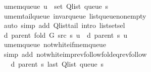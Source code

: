 \begin{isabellebody}
\ u{\isacharunderscore}{\kern0pt}mem{\isacharunderscore}{\kern0pt}queue{\isacharcolon}{\kern0pt}\ {\isachardoublequoteopen}u\ {\isasymin}\ set\ {\isacharparenleft}{\kern0pt}Q{\isacharunderscore}{\kern0pt}list\ {\isacharparenleft}{\kern0pt}queue\ s{\isacharparenright}{\kern0pt}{\isacharparenright}{\kern0pt}{\isachardoublequoteclose}\isanewline
\ \ \ \ \isamarkupfalse%
\ u{\isacharunderscore}{\kern0pt}mem{\isacharunderscore}{\kern0pt}tail{\isacharunderscore}{\kern0pt}queue\ invar{\isacharunderscore}{\kern0pt}queue\ list{\isacharunderscore}{\kern0pt}queue{\isacharunderscore}{\kern0pt}non{\isacharunderscore}{\kern0pt}empty\isanewline
\ \ \ \ \isamarkupfalse%
\ {\isacharparenleft}{\kern0pt}auto\ simp\ add{\isacharcolon}{\kern0pt}\ Q{\isachardot}{\kern0pt}list{\isacharunderscore}{\kern0pt}tail\ intro{\isacharcolon}{\kern0pt}\ list{\isachardot}{\kern0pt}set{\isacharunderscore}{\kern0pt}sel{\isacharparenleft}{\kern0pt}{}{\isacharparenright}{\kern0pt}{\isacharparenright}{\kern0pt}\isanewline
\ \ \isamarkupfalse%
\ {\isachardoublequoteopen}d\ {\isacharparenleft}{\kern0pt}parent\ {\isacharparenleft}{\kern0pt}fold\ G\ src\ s{\isacharparenright}{\kern0pt}{\isacharparenright}{\kern0pt}\ u\ {\isacharequal}{\kern0pt}\ d\ {\isacharparenleft}{\kern0pt}parent\ s{\isacharparenright}{\kern0pt}\ u{\isachardoublequoteclose}\isanewline
\ \ \ \ \isamarkupfalse%
\ u{\isacharunderscore}{\kern0pt}mem{\isacharunderscore}{\kern0pt}queue\ not{\isacharunderscore}{\kern0pt}white{\isacharunderscore}{\kern0pt}if{\isacharunderscore}{\kern0pt}mem{\isacharunderscore}{\kern0pt}queue\isanewline
\ \ \ \ \isamarkupfalse%
\ {\isacharparenleft}{\kern0pt}simp\ add{\isacharcolon}{\kern0pt}\ not{\isacharunderscore}{\kern0pt}white{\isacharunderscore}{\kern0pt}imp{\isacharunderscore}{\kern0pt}rev{\isacharunderscore}{\kern0pt}follow{\isacharunderscore}{\kern0pt}fold{\isacharunderscore}{\kern0pt}eq{\isacharunderscore}{\kern0pt}rev{\isacharunderscore}{\kern0pt}follow{\isacharparenright}{\kern0pt}\isanewline
\ \ \isamarkupfalse%
\ \isamarkupfalse%
\ {\isachardoublequoteopen}{\isachardot}{\kern0pt}{\isachardot}{\kern0pt}{\isachardot}{\kern0pt}\ {\isasymle}\ d\ {\isacharparenleft}{\kern0pt}parent\ s{\isacharparenright}{\kern0pt}\ {\isacharparenleft}{\kern0pt}last\ {\isacharparenleft}{\kern0pt}Q{\isacharunderscore}{\kern0pt}list\ {\isacharparenleft}{\kern0pt}queue\ s{\isacharparenright}{\kern0pt}{\isacharparenright}{\kern0pt}{\isacharparenright}{\kern0pt}{\isachardoublequoteclose}\isanewline

\end{isabellebody}
